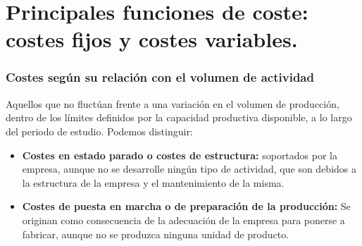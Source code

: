 \documentclass[12pt]{book} %
\begin{document}
\hypertarget{principales-funciones-de-coste-costes-fijos-y-costes-variables.}{%
\section{Principales funciones de coste: costes fijos y costes
variables.}\label{principales-funciones-de-coste-costes-fijos-y-costes-variables.}}

\hypertarget{costes-seguxfan-su-relaciuxf3n-con-el-volumen-de-actividad}{%
\subsubsection{Costes según su relación con el volumen de
actividad}\label{costes-seguxfan-su-relaciuxf3n-con-el-volumen-de-actividad}}

\begin{definicion}
Aquellos que no fluctúan frente a una variación en el volumen de producción, dentro de los límites definidos por la capacidad productiva disponible, a lo largo del periodo de estudio. Podemos distinguir:
\begin{itemize}
\item \textbf{Costes en estado parado o costes de estructura:} soportados por la empresa, aunque no se desarrolle ningún tipo de actividad, que son debidos a la estructura de la empresa y el mantenimiento de la misma.
\item \textbf{Costes de puesta en marcha o de preparación de la producción:} Se originan como consecuencia de la adecuación de la empresa para ponerse a fabricar, aunque no se produzca ninguna unidad de producto. 
\end{itemize} 
\end{definicion}
\end{document}
